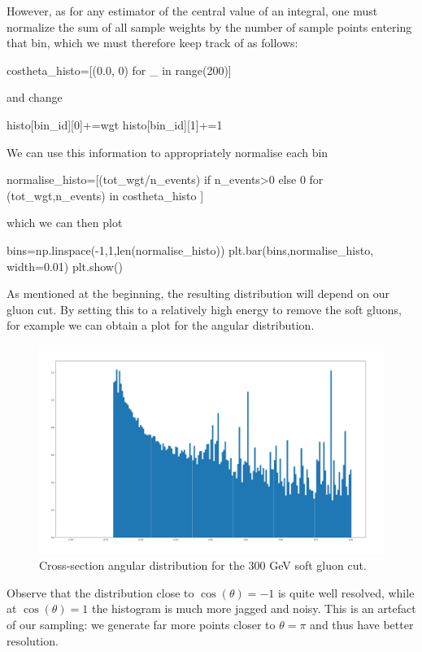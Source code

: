 However, as for any estimator of the central value of an integral, one must normalize the sum of all sample weights by the number of sample points entering that bin, which we must therefore keep track of as follows:
\begin{codeenv}
        costheta_histo=[(0.0, 0) for _ in range(200)]
\end{codeenv}
and change 
            \begin{codeenv}
histo[bin_id][0]+=wgt
histo[bin_id][1]+=1
            \end{codeenv}
\color{black}
We can use this information to appropriately normalise each bin
\begin{codeenv}
        normalise_histo=[(tot_wgt/n_events) if n_events>0 
        else 0 for (tot_wgt,n_events) in costheta_histo ]
\end{codeenv}
which we can then plot
\begin{codeenv}
    bins=np.linspace(-1,1,len(normalise_histo))
    plt.bar(bins,normalise_histo, width=0.01)
    plt.show()
\end{codeenv}
As mentioned at the beginning, the resulting distribution will depend on our gluon cut. By setting this to a relatively high energy to remove the soft gluons, for example  we can obtain a plot for the angular distribution.
\begin{figure}[H]
    \centering
    \includegraphics[width=0.75\linewidth]{tex/ims/angular_dist.png}
    \caption{Cross-section angular distribution for the 300 GeV soft gluon cut.}
    \label{fig:enter-label}
\end{figure}
Observe that the distribution close to $\cos(\theta)=-1$ is quite well resolved, while at $\cos(\theta)=1$ the histogram is much more jagged and noisy. This is an artefact of our sampling: we generate far more points closer to $\theta=\pi$ and thus have better resolution.
